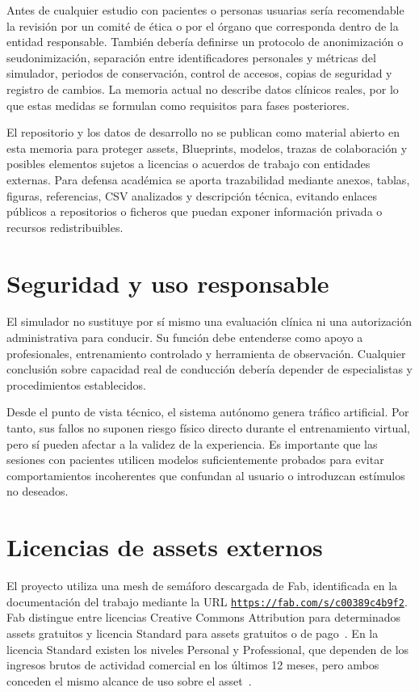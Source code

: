 Antes de cualquier estudio con pacientes o personas usuarias sería recomendable la revisión por un comité de ética o por el órgano que corresponda dentro de la entidad responsable. También debería definirse un protocolo de anonimización o seudonimización, separación entre identificadores personales y métricas del simulador, periodos de conservación, control de accesos, copias de seguridad y registro de cambios. La memoria actual no describe datos clínicos reales, por lo que estas medidas se formulan como requisitos para fases posteriores.

El repositorio y los datos de desarrollo no se publican como material abierto en esta memoria para proteger assets, Blueprints, modelos, trazas de colaboración y posibles elementos sujetos a licencias o acuerdos de trabajo con entidades externas. Para defensa académica se aporta trazabilidad mediante anexos, tablas, figuras, referencias, CSV analizados y descripción técnica, evitando enlaces públicos a repositorios o ficheros que puedan exponer información privada o recursos redistribuibles.

\section{Seguridad y uso responsable}

El simulador no sustituye por sí mismo una evaluación clínica ni una autorización administrativa para conducir. Su función debe entenderse como apoyo a profesionales, entrenamiento controlado y herramienta de observación. Cualquier conclusión sobre capacidad real de conducción debería depender de especialistas y procedimientos establecidos.

Desde el punto de vista técnico, el sistema autónomo genera tráfico artificial. Por tanto, sus fallos no suponen riesgo físico directo durante el entrenamiento virtual, pero sí pueden afectar a la validez de la experiencia. Es importante que las sesiones con pacientes utilicen modelos suficientemente probados para evitar comportamientos incoherentes que confundan al usuario o introduzcan estímulos no deseados.

\section{Licencias de assets externos}

El proyecto utiliza una mesh de semáforo descargada de Fab, identificada en la documentación del trabajo mediante la URL \href{https://fab.com/s/c00389c4b9f2}{\texttt{https://fab.com/s/c00389c4b9f2}}. Fab distingue entre licencias Creative Commons Attribution para determinados assets gratuitos y licencia Standard para assets gratuitos o de pago~\cite{fablicenses}. En la licencia Standard existen los niveles Personal y Professional, que dependen de los ingresos brutos de actividad comercial en los últimos 12 meses, pero ambos conceden el mismo alcance de uso sobre el asset~\cite{fabstandard}.

